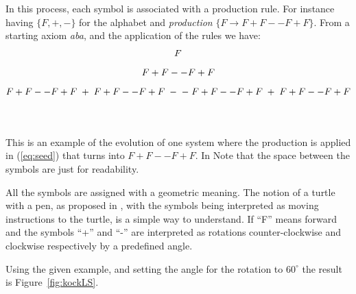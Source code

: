 In this process, each symbol is associated with a production rule. For instance having $\{F, +, -\}$ for the alphabet and \emph{production} $\{F \rightarrow
 F+F--F+F\}$. From a starting axiom \emph{aba}, and the application of the rules we have:\\
\begin{equation} \label{eq:seed}
F\\
\end{equation}
\begin{equation} \label{eq:step1}
F+F--F+F\\
\end{equation}
\begin{equation} \label{eq:step2}
F+F--F+F \; + \; F+F--F+F \;- \;- \;F+F--F+F \;+ \;F+F--F+F\\
\end{equation}

\\
\\
This is an example of the evolution of one system where the production is applied  in (\ref{eq:seed}) that turns into $F+F--F+F$. In Note that the space between the symbols are just for readability.

All the symbols are assigned with a geometric meaning. The notion of a turtle with a pen, as proposed in \cite{abelson1982aa}, with the symbols being interpreted as moving instructions to the turtle, is a simple way to understand. If ``F'' means forward and the symbols ``+'' and ``-'' are interpreted as rotations counter-clockwise and clockwise respectively by a predefined angle. 

Using the given example, and setting the angle for the rotation to $60^{\circ}$ the result is Figure~\ref{fig:kockLS}.

